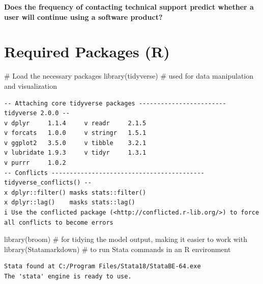 \documentclass[
  letterpaper,
  DIV=11,
  numbers=noendperiod]{scrreprt}
\newenvironment{Shaded}{\begin{snugshade}}{\end{snugshade}}
\newcommand{\AttributeTok}[1]{\textcolor[rgb]{0.40,0.45,0.13}{#1}}
\newcommand{\CommentTok}[1]{\textcolor[rgb]{0.37,0.37,0.37}{#1}}
\newcommand{\FunctionTok}[1]{\textcolor[rgb]{0.28,0.35,0.67}{#1}}
\newcommand{\NormalTok}[1]{\textcolor[rgb]{0.00,0.23,0.31}{#1}}
\newcommand{\OtherTok}[1]{\textcolor[rgb]{0.00,0.23,0.31}{#1}}
\newcommand{\SpecialCharTok}[1]{\textcolor[rgb]{0.37,0.37,0.37}{#1}}
\newcommand{\StringTok}[1]{\textcolor[rgb]{0.13,0.47,0.30}{#1}}
\begin{document}
\textbf{Does the frequency of contacting technical support predict
whether a user will continue using a software product?}

\section{Required Packages (R)}\label{required-packages-r-1}

\begin{Shaded}
\begin{Highlighting}[]
\CommentTok{\# Load the necessary packages }
\FunctionTok{library}\NormalTok{(tidyverse) }\CommentTok{\# used for data manipulation and visualization}
\end{Highlighting}
\end{Shaded}

\begin{verbatim}
-- Attaching core tidyverse packages ------------------------ tidyverse 2.0.0 --
v dplyr     1.1.4     v readr     2.1.5
v forcats   1.0.0     v stringr   1.5.1
v ggplot2   3.5.0     v tibble    3.2.1
v lubridate 1.9.3     v tidyr     1.3.1
v purrr     1.0.2     
-- Conflicts ------------------------------------------ tidyverse_conflicts() --
x dplyr::filter() masks stats::filter()
x dplyr::lag()    masks stats::lag()
i Use the conflicted package (<http://conflicted.r-lib.org/>) to force all conflicts to become errors
\end{verbatim}

\begin{Shaded}
\begin{Highlighting}[]
\FunctionTok{library}\NormalTok{(broom) }\CommentTok{\# for tidying the model output, making it easier to work with}
\FunctionTok{library}\NormalTok{(Statamarkdown) }\CommentTok{\# to run Stata commands in an R environment}
\end{Highlighting}
\end{Shaded}

\begin{verbatim}
Stata found at C:/Program Files/Stata18/StataBE-64.exe
The 'stata' engine is ready to use.
\end{verbatim}

\begin{Shaded}
\end{Shaded}
\end{document}

